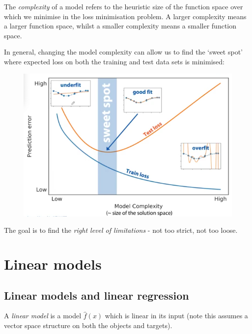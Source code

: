 \begin{framedef}
The \textit{complexity} of a model refers to the heuristic size of the function space over which we minimise in the loss minimisation problem. A larger complexity means a larger function space, whilst a smaller complexity means a smaller function space.
\end{framedef}



\newpage
In general, changing the model complexity can allow us to find the `sweet spot' where expected loss on both the training and test data sets is minimised:

\begin{figure}[H]
\centering
\includegraphics[scale=0.5]{traintest.png}
\end{figure}

The goal is to find the \textit{right level of limitations} - not too strict, not too loose.




\newpage
\section{Linear models}
\subsection{Linear models and linear regression}
\begin{framedef}
A \textit{linear model} is a model $\hat{f}(x)$ which is linear in its input (note this assumes a vector space structure on both the objects and targets). 
\end{framedef}

